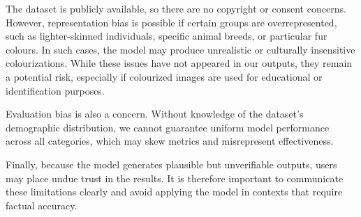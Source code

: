 \documentclass{article} %
\begin{document}
The dataset is publicly available, so there are no copyright or consent concerns. However, representation bias is possible if certain groups are overrepresented, such as lighter-skinned 
individuals, specific animal breeds, or particular fur colours. In such cases, the model may produce unrealistic or culturally insensitive colourizations. While these issues have not appeared 
in our outputs, they remain a potential risk, especially if colourized images are used for educational or identification purposes.

Evaluation bias is also a concern. Without knowledge of the dataset's demographic distribution, we cannot guarantee uniform model performance across all categories, which may skew metrics 
and misrepresent effectiveness.

Finally, because the model generates plausible but unverifiable outputs, users may place undue trust in the results. It is therefore important to communicate these limitations clearly and 
avoid applying the model in contexts that require factual accuracy.

\label{last_page}

\newpage


\end{document}

